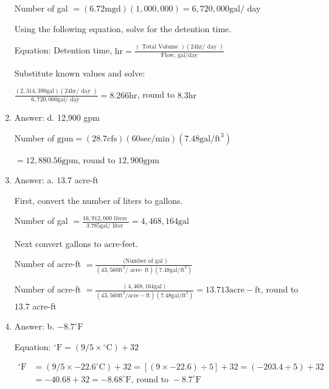 \documentclass[10pt]{article}
\begin{document}
\begin{enumerate}
Number of gal $=(6.72 \mathrm{mgd})(1,000,000)=6,720,000 \mathrm{gal} /$ day

Using the following equation, solve for the detention time.

Equation: Detention time, $\mathrm{hr}=\frac{(\text { Total Volume })(24 \mathrm{hr} / \text { day })}{\text { Flow, gal/day }}$

Substitute known values and solve:

$\frac{(2,314,390 \mathrm{gal})(24 \mathrm{hr} / \text { day })}{6,720,000 \mathrm{gal} / \text { day }}=8.266 \mathrm{hr}$, round to $8.3 \mathrm{hr}$

  \item Answer: d. 12,900 gpm

Number of $\mathrm{gpm}=(28.7 \mathrm{cfs})(60 \mathrm{sec} / \mathrm{min})\left(7.48 \mathrm{gal} / \mathrm{ft}^{3}\right)$

$=12,880.56 \mathrm{gpm}$, round to $12,900 \mathrm{gpm}$

  \item Answer: a. $13.7$ acre-ft

First, convert the number of liters to gallons.

Number of gal $=\frac{16,912,000 \text { liters }}{3.785 \mathrm{gal} / \text { liter }}=4,468,164 \mathrm{gal}$

Next convert gallons to acre-feet.

Number of acre-ft $=\frac{\text { (Number of gal })}{\left(43,560 \mathrm{ft}^{3} / \text { acre- } \mathrm{ft}\right)\left(7.48 \mathrm{gal} / \mathrm{ft}^{3}\right)}$

Number of acre-ft $=\frac{(4,468,164 \mathrm{gal})}{\left(43,560 \mathrm{ft}^{3} / \mathrm{acre}-\mathrm{ft}\right)\left(7.48 \mathrm{gal} / \mathrm{ft}^{3}\right)}=13.713 \mathrm{acre}-\mathrm{ft}$, round to $13.7$ acre-ft

  \item Answer: b. $-8.7^{\circ} \mathrm{F}$

Equation: ${ }^{\circ} \mathrm{F}=\left(9 / 5 \times{ }^{\circ} \mathrm{C}\right)+32$

$$
\begin{aligned}
{ }^{\circ} \mathrm{F} &=\left(9 / 5 \times-22.6^{\circ} \mathrm{C}\right)+32=[(9 \times-22.6) \div 5]+32=(-203.4 \div 5)+32 \\
&=-40.68+32=-8.68^{\circ} \mathrm{F} \text {, round to }-8.7^{\circ} \mathrm{F}
\end{aligned}
$$


\end{enumerate}
\end{document}
